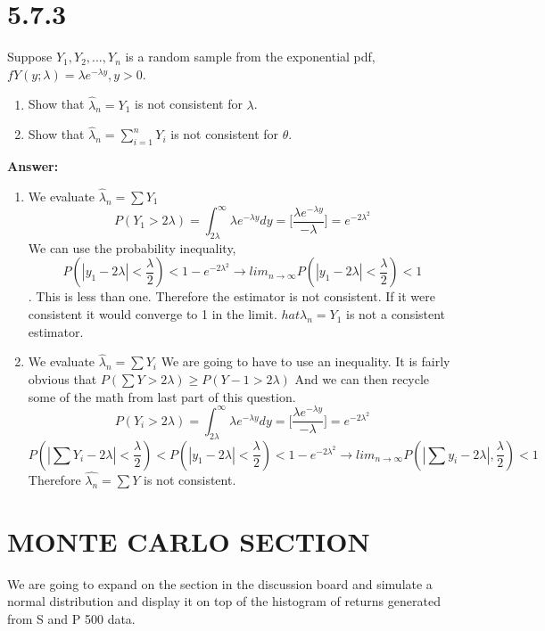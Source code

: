 \documentclass[11pt]{article}
\begin{document}
\section{5.7.3}
 Suppose $Y_1,Y_2,...,Y_n$ is a random sample from the exponential pdf, $fY(y; \lambda) = \lambda e^{-\lambda y}, y > 0$. 
\begin{enumerate}[label = (\alph*)]
\item
Show that $\hat{\lambda}_n = Y_1$ is not consistent for $\lambda$.
\item
Show that $\hat{\lambda}_n = \sum^{n}_{i=1}Y_i$ is not consistent for $\theta$.
\end{enumerate}

\textbf{Answer:}

\begin{enumerate}[label = (\alph*)]
\item
We evaluate $\hat{\lambda}_n=\sum Y_1$
$$P(Y_1>2\lambda)= \int^{\infty}_{2\lambda}\lambda e^{-\lambda y}dy = \Big[  \frac{\lambda e^{-\lambda y}}{-\lambda}\Big]=e^{-2\lambda^2}$$
We can use the probability inequality,
$$ P(|y_1 - 2\lambda | < \frac{\lambda}{2})<1- e^{-2\lambda^2} \rightarrow lim_{n \to \infty}P(|y_1 - 2\lambda | < \frac{\lambda}{2})<1$$.
This is less than one. Therefore the estimator is not consistent. If it were consistent it would converge to 1 in the limit. $hat{\lambda}_n = Y_1$ is not a consistent estimator.
\item
We evaluate $\hat{\lambda}_n=\sum Y_i$
\newline
We are going to have to use an inequality. It is fairly obvious that $P(\sum Y>2\lambda)\geq P(Y-1>2\lambda)$ And we can then recycle some of the math from last part of this question.
$$P(Y_i>2\lambda)= \int^{\infty}_{2\lambda}\lambda e^{-\lambda y}dy = \Big[  \frac{\lambda e^{-\lambda y}}{-\lambda}\Big]=e^{-2\lambda^2}$$
$$ P(|\sum Y_i - 2\lambda | < \frac{\lambda}{2})<P(|y_1 - 2\lambda | < \frac{\lambda}{2})<1- e^{-2\lambda^2} \rightarrow lim_{n \to \infty}P(|\sum y_i - 2\lambda | , \frac{\lambda}{2})<1$$
Therefore $\hat{\lambda_n}=\sum Y$ is not consistent.
\end{enumerate}

\section{MONTE CARLO SECTION}
We are going to expand on the section in the discussion board and simulate a normal distribution and display it on top of the histogram of returns generated from S and P 500 data. 
\end{document}
